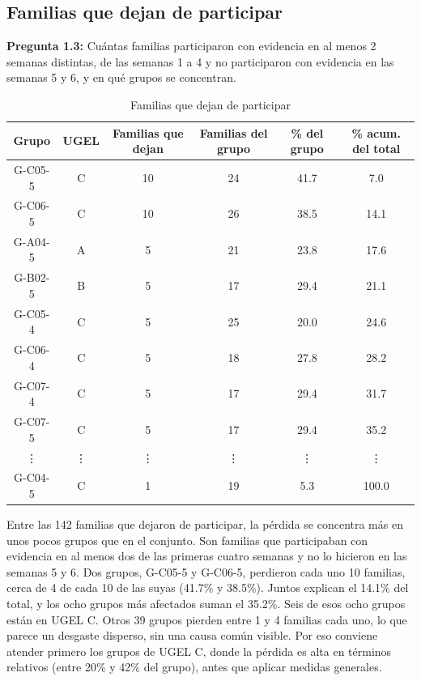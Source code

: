 \documentclass[12pt,a4paper]{article}
\begin{document}
		\subsection{Familias que dejan de participar}
			
			\noindent \textbf{Pregunta 1.3:} Cuántas familias participaron con evidencia en al menos 2 semanas distintas, de las 
			semanas 1 a 4 y no participaron con evidencia en las semanas 5 y 6, y en qué grupos se 
			concentran. 
			
			\begin{table}[h]
				\centering
				\caption{Familias que dejan de participar}
				\label{tab: tasa}
				\begin{tabular}{cccccc}
					\toprule
					Grupo & UGEL & Familias que dejan & Familias del grupo & \% del grupo & \% acum. del total  \\
					\midrule
					G-C05-5 & C & 10 & 24 & 41.7 &  7.0 \\
					G-C06-5 & C & 10 & 26 & 38.5 & 14.1 \\
					G-A04-5 & A & 5  & 21 & 23.8 & 17.6 \\
					G-B02-5 & B & 5  & 17 & 29.4 & 21.1 \\
					G-C05-4 & C & 5  & 25 & 20.0 & 24.6 \\
					G-C06-4 & C & 5  & 18 & 27.8 & 28.2 \\
					G-C07-4 & C & 5  & 17 & 29.4 & 31.7 \\
					G-C07-5 & C & 5  & 17 & 29.4 & 35.2 \\
					\vdots & \vdots & \vdots  & \vdots  & \vdots  & \vdots  \\
					G-C04-5& C &  1  & 19 & 5.3 & 100.0 \\
					\bottomrule
				\end{tabular}
			\end{table}
			
		\noindent Entre las 142 familias que dejaron de participar, la pérdida se concentra más en unos pocos grupos
		que en el conjunto. Son familias que participaban con evidencia en al menos dos de las primeras
		cuatro semanas y no lo hicieron en las semanas 5 y 6. Dos grupos, G-C05-5 y G-C06-5, perdieron cada
		uno 10 familias, cerca de 4 de cada 10 de las suyas (41.7\% y 38.5\%). Juntos explican el 14.1\% del 
		total, y los ocho grupos más afectados suman el 35.2\%. Seis de esos ocho grupos están en UGEL C.
		Otros 39 grupos pierden entre 1 y 4 familias cada uno, lo que parece un desgaste disperso, sin una 
		causa común visible. Por eso conviene atender primero los grupos de UGEL C, donde la pérdida es
		alta en términos relativos (entre 20\% y 42\% del grupo), antes que aplicar medidas generales.
		
\end{document}
